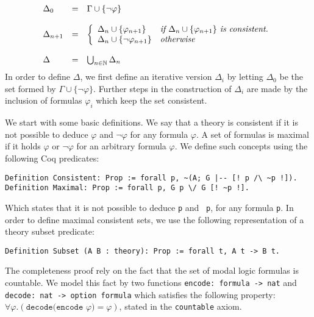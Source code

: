 \documentclass[3p,times]{elsarticle}
\begin{document}
\[
  \begin{array}{lcl}
    \Delta_{0}    & = & \Gamma \cup \{\neg \varphi\}\\ \\
    \Delta_{n + 1} & = & \left \{
                         \begin{array}{ll}
                           \Delta_{n} \cup \{ \varphi_{n + 1}\}      & \emph{if }\Delta_{n} \cup \{\varphi_{n + 1}\} \emph{ is consistent.}\\
                           \Delta_{n} \cup \{\neg \varphi_{n  + 1}\} & \emph{otherwise}\\
                         \end{array}
                         \right. \\ & & \\
    \Delta        & = & \bigcup_{n \in \mathbb{N}} \Delta_{n}
  \end{array}
\]
In order to define $\Delta$, we first define an iterative version $\Delta_{i}$ by letting $\Delta_{0}$ be the
set formed by $\Gamma \cup \{\neg\varphi\}$. Further steps in the construction of $\Delta_{i}$ are made by
the inclusion of formulas $\varphi_{i}$ which keep the set consistent.

We start with some basic definitions. We say that a theory is consistent if it is not possible to deduce
$\varphi$ and $\neg \varphi$ for any formula $\varphi$. A set of formulas is maximal if it holds $\varphi$ or $\neg \varphi$
for an arbitrary formula $\varphi$. We define such concepts using the following Coq predicates:

\begin{verbatim}
Definition Consistent: Prop := forall p, ~(A; G |-- [! p /\ ~p !]).
Definition Maximal: Prop := forall p, G p \/ G [! ~p !].
\end{verbatim}

Which states that it is not possible to deduce \texttt{p} and \texttt{~p}, for any formula \texttt{p}.
In order to define maximal consistent sets, we use the following representation of a theory
subset predicate:

\begin{verbatim}
Definition Subset (A B : theory): Prop := forall t, A t -> B t.
\end{verbatim}

The completeness proof rely on the fact that the set of modal logic formulas is countable. We model
this fact by two functions \texttt{encode: formula -> nat} and \texttt{decode: nat -> option formula}
which satisfies the following property: $\forall \varphi . (\texttt{decode(encode }\varphi\texttt{)} = \varphi)$, stated in the \texttt{countable} axiom.
\end{document}
